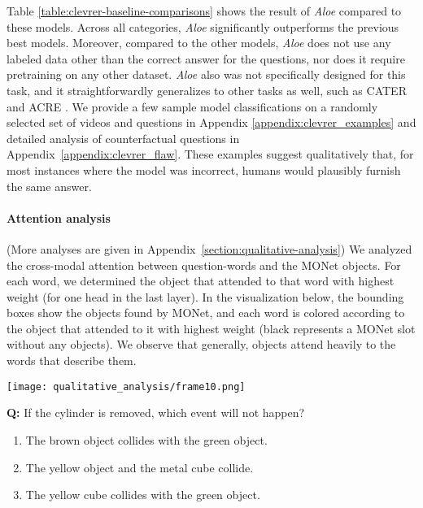 \documentclass{article}
\newcommand{\Model}{\emph{Aloe}}
\begin{document}
Table \ref{table:clevrer-baseline-comparisons} shows the result
of \Model{} compared to these models.
Across all categories, \Model{} significantly outperforms the previous best models.
Moreover, compared to the other models, \Model{} does not use any labeled
data other than the correct answer for the questions, nor does it require pretraining on any other dataset.
\Model{} also was not specifically designed for this task, and it straightforwardly generalizes to other tasks as well, such as CATER \citep{cater} and ACRE \citep{acre}.
We provide a few sample model classifications
on a randomly selected set of videos and questions
in Appendix \ref{appendix:clevrer_examples}
and detailed analysis of counterfactual questions in Appendix~\ref{appendix:clevrer_flaw}.
These examples suggest qualitatively that, for most instances where the model was incorrect, humans would plausibly furnish the same answer.


\paragraph{Attention analysis} 
(More analyses are given in Appendix~\ref{section:qualitative-analysis})
We analyzed the cross-modal attention between question-words and the MONet objects.
For each word, we determined the object that attended to that word with highest weight (for one head in the last layer).
In the visualization below,
the bounding boxes show the objects found by MONet,
and each word is colored according to the object that attended to it with highest weight
(black represents a MONet slot without any objects).
We observe that generally, objects attend heavily to the words that describe them.

\noindent\begin{minipage}{0.4\textwidth}
 \texttt{[image: qualitative\_analysis/frame10.png]}
 \end{minipage}\begin{minipage}{0.5\textwidth}
\textbf{Q:} {\color{darkgreen} If}
{\color{cyan} the}
{\color{cyan} cylinder}
{\color{darkgreen} is}
{\color{cyan} removed,}
{\color{darkgreen} which}
{\color{cyan} event}
{\color{cyan} will}
{\color{darkgreen} not}
{\color{cyan} happen?}

\begin{enumerate}[leftmargin=*]
\item {\color{darkgreen} The}
{\color{darkbrown} brown}
{\color{darkbrown} object}
{\color{darkgreen} collides}
{\color{darkgreen} with}
{\color{darkgreen} the}
{\color{darkgreen} green}
{\color{darkgreen} object.}

\item {\color{darkgreen} The}
yellow
{\color{darkyellow} object}
{\color{darkbrown} and}
{\color{darkbrown} the}
{\color{darkbrown} metal}
{\color{darkbrown} cube}
{\color{darkbrown} collide.}

\item {\color{darkgreen} The}
{\color{darkyellow} yellow}
{\color{darkyellow} cube}
{\color{darkgreen} collides}
{\color{darkgreen} with}
{\color{darkgreen} the}
{\color{darkgreen} green}
{\color{darkgreen} object.}
\end{enumerate}
\end{minipage}
\end{document}
